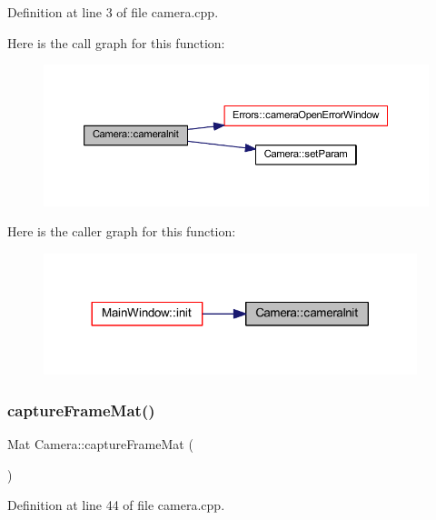 Definition at line 3 of file camera.\+cpp.

Here is the call graph for this function\+:
\nopagebreak
\begin{figure}[H]
\begin{center}
\leavevmode
\includegraphics[width=350pt]{classCamera_a6d17b81a1e987db60f5144d922f54e9d_cgraph}
\end{center}
\end{figure}
Here is the caller graph for this function\+:
\nopagebreak
\begin{figure}[H]
\begin{center}
\leavevmode
\includegraphics[width=308pt]{classCamera_a6d17b81a1e987db60f5144d922f54e9d_icgraph}
\end{center}
\end{figure}
\mbox{\label{classCamera_abfa965e4380023e2295edd9a13f4ee63}} 
\subsubsection{\texorpdfstring{captureFrameMat()}{captureFrameMat()}}
{\footnotesize\ttfamily Mat Camera\+::capture\+Frame\+Mat (\begin{DoxyParamCaption}{ }\end{DoxyParamCaption})}



Definition at line 44 of file camera.\+cpp.

